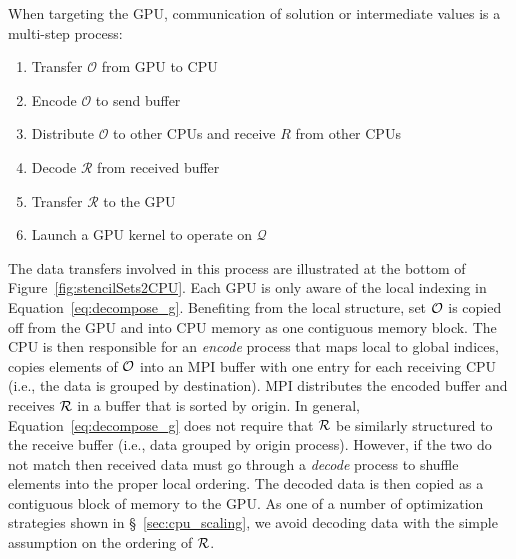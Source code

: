 \documentclass{report}
\begin{document}
When targeting the GPU, communication of solution or intermediate values is a multi-step process:
   \begin{enumerate}
    \item Transfer $\mathcal{O}$ from GPU to CPU
    \item Encode $\mathcal{O}$ to send buffer
	\item Distribute $\mathcal{O}$ to other CPUs and receive $R$ from other CPUs
	\item Decode $\mathcal{R}$ from received buffer  
	\item Transfer $\mathcal{R}$ to the GPU
	\item Launch a GPU kernel to operate on $\mathcal{Q}$
   \end{enumerate} 
The data transfers involved in this process are illustrated at the bottom of Figure~\ref{fig:stencilSets2CPU}.
    Each GPU is only aware of the local indexing in Equation~\ref{eq:decompose_g}. Benefiting from the local structure, set 
$\mathcal{O}$ is copied off from the GPU and into CPU memory as one contiguous memory block. The CPU is then responsible for an \emph{encode} process that maps local to global indices, copies elements of $\mathcal{O}$ into an MPI buffer with one entry for each receiving CPU (i.e., the data is grouped by destination). MPI distributes the encoded buffer and receives $\mathcal{R}$ in a buffer that is sorted by origin. In general, Equation~\ref{eq:decompose_g} does not require that $\mathcal{R}$ be similarly structured to the receive buffer (i.e., data grouped by origin process). However, if the two do not match then received data must go through a \emph{decode} process to shuffle elements into the proper local ordering. The decoded data is then copied as a contiguous block of memory to the GPU. As one of a number of optimization strategies shown in \S~\ref{sec:cpu_scaling}, we avoid decoding data with the simple assumption on the ordering of $\mathcal{R}$. %
\end{document}
